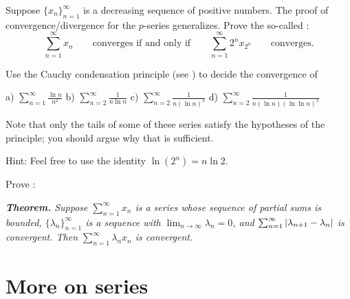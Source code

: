 \begin{exercise}[Challenging] \label{exercise:cauchycondensation}
Suppose $\{ x_n\}_{n=1}^\infty$ is a decreasing sequence of positive numbers.
The proof of convergence/divergence for the $p$-series generalizes.
Prove the so-called 
\emph{}:
\begin{equation*}
\sum_{n=1}^\infty x_n
\qquad \text{converges if and only if} \qquad
\sum_{n=1}^\infty 2^n x_{2^n} \qquad \text{converges}.
\end{equation*}
\end{exercise}

\begin{exercise}
Use the Cauchy condensation principle
(see )
to decide the convergence of

\medskip

\noindent
a) $\displaystyle \sum_{n=1}^\infty \frac{\ln n}{n^2}$
\qquad
b) $\displaystyle \sum_{n=2}^\infty \frac{1}{n \ln n}$
\qquad
c) $\displaystyle \sum_{n=2}^\infty \frac{1}{n {(\ln n)}^2}$
\qquad
d) $\displaystyle \sum_{n=2}^\infty \frac{1}{n (\ln n ){(\ln \ln n)}^2}$

\medskip

\noindent
Note that only the tails of some of these series satisfy the
hypotheses of the principle; you should argue why that is sufficient.

\noindent
Hint: Feel free to use the identity $\ln (2^n) = n \ln 2$.
\end{exercise}

\begin{exercise}[Challenging]
Prove \emph{}:

\medskip

\noindent
\emph{\textbf{Theorem.} Suppose $\sum_{n=1}^\infty x_n$ is a series whose sequence of partial sums
is bounded, $\{ \lambda_n \}_{n=1}^\infty$ is a sequence with
$\lim_{n\to\infty} \lambda_n = 0$, and
$\sum_{n=1}^\infty \left\lvert { \lambda_{n+1} - \lambda_n } \right\rvert$ is convergent.
Then $\sum_{n=1}^\infty \lambda_n x_n$ is convergent.}
\end{exercise}




\sectionnewpage
\section{More on series}
\label{sec:moreonseries}

